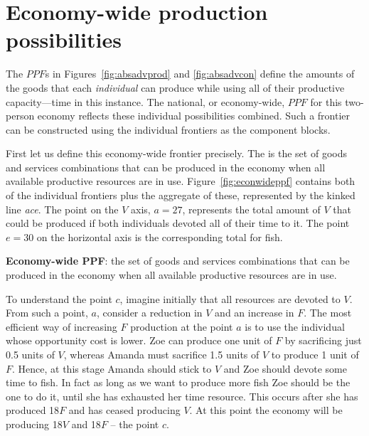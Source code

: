\section{Economy-wide production possibilities}\label{sec:ch1sec5}

The $PPF$s in Figures~\ref{fig:absadvprod} and \ref{fig:absadvcon} define the amounts of the goods
that each \textit{individual} can produce while using all of their
productive capacity---time in this instance. The national, or economy-wide, 
$PPF$ for this two-person economy reflects these individual possibilities
combined. Such a frontier can be constructed using the individual frontiers
as the component blocks.

First let us define this economy-wide frontier precisely. The %
 is the set of goods and services
combinations that can be produced in the economy when all available
productive resources are in use. Figure~\ref{fig:econwideppf} contains both
of the individual frontiers plus the aggregate of these, represented by the
kinked line \textit{ace}. The point on the $V$ axis, $a=27$, represents the
total amount of $V$ that could be produced if both individuals devoted all
of their time to it. The point $e=30$ on the horizontal axis is the
corresponding total for fish.


\newhtmlpage



\begin{DefBox}
	\textbf{Economy-wide PPF}: the set of goods and services combinations that can be produced in the economy when all available productive resources are in use.
\end{DefBox}

To understand the point $c$, imagine initially that all resources are
devoted to $V$. From such a point, $a$, consider a reduction in $V$ and an
increase in $F$. The most efficient way of increasing $F$ production at the
point $a$ is to use the individual whose opportunity cost is lower. Zoe can produce
one unit of $F$ by sacrificing just 0.5 units of $V$, whereas Amanda must
sacrifice 1.5 units of $V$ to produce 1 unit of $F$. Hence, at this stage
Amanda should stick to $V$ and Zoe should devote some time to fish. In fact
as long as we want to produce more fish Zoe should be the one to do it,
until she has exhausted her time resource. This occurs after she has
produced 18$F$ and has ceased producing $V$. At this point the economy will
be producing 18$V$ and 18$F$ -- the point $c$.

